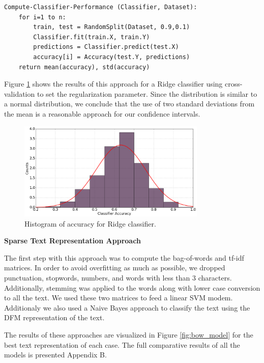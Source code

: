 \documentclass[12pt]{article}
\begin{document}
\begin{lstlisting}
Compute-Classifier-Performance (Classifier, Dataset):
    for i=1 to n: 
        train, test = RandomSplit(Dataset, 0.9,0.1)
        Classifier.fit(train.X, train.Y)
        predictions = Classifier.predict(test.X)
        accuracy[i] = Accuracy(test.Y, predictions)
    return mean(accuracy), std(accuracy)
\end{lstlisting}

Figure \ref{fig:normal} shows the results of this approach for a Ridge classifier using cross-validation to set the regularization parameter. Since the distribution is similar to a normal distribution, we conclude that the use of two standard deviations from the mean is a reasonable approach for our confidence intervals. 

\begin{figure}[htbp]
    \centering
    \includegraphics[width=0.8\textwidth]{index}
    \caption{Histogram of accuracy for Ridge classifier.}
    \label{fig:normal}
\end{figure}


\textbf{Sparse Text Representation Approach}

The first step with this approach was to compute the bag-of-words and tf-idf matrices. In order to avoid overfitting as much as possible, we dropped punctuation, stopwords, numbers, and words with less than 3 characters. Additionally, stemming was applied to the words along with lower case conversion to all the text. We used these two matrices to feed a linear SVM modem. Additionaly we also used a Naive Bayes approach to classify the text using the DFM representation of the text.

The results of these approaches are visualized in Figure \ref{fig:bow_model} for the best text representation of each case. The full comparative results of all the models is presented Appendix B. 
\end{document}
